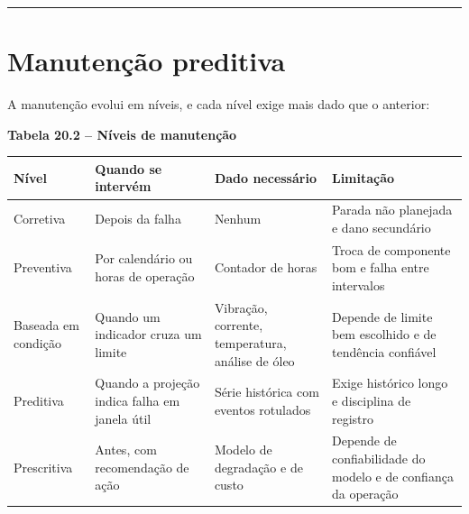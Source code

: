 \begin{center}\rule{0.5\linewidth}{0.5pt}\end{center}

\section{Manutenção preditiva}\label{manutenuxe7uxe3o-preditiva}

A manutenção evolui em níveis, e cada nível exige mais dado que o anterior:

\textbf{Tabela 20.2 -- Níveis de manutenção}

\begin{longtable}[]{@{}
  >{\raggedright\arraybackslash}p{}
  >{\raggedright\arraybackslash}p{}
  >{\raggedright\arraybackslash}p{}
  >{\raggedright\arraybackslash}p{}@{}}
\toprule\noalign{}
\begin{minipage}[b]{\linewidth}\raggedright
Nível
\end{minipage} & \begin{minipage}[b]{\linewidth}\raggedright
Quando se intervém
\end{minipage} & \begin{minipage}[b]{\linewidth}\raggedright
Dado necessário
\end{minipage} & \begin{minipage}[b]{\linewidth}\raggedright
Limitação
\end{minipage} \\
\midrule\noalign{}
\endhead
\bottomrule\noalign{}
\endlastfoot
Corretiva & Depois da falha & Nenhum & Parada não planejada e dano secundário \\
Preventiva & Por calendário ou horas de operação & Contador de horas & Troca de componente bom e falha entre intervalos \\
Baseada em condição & Quando um indicador cruza um limite & Vibração, corrente, temperatura, análise de óleo & Depende de limite bem escolhido e de tendência confiável \\
Preditiva & Quando a projeção indica falha em janela útil & Série histórica com eventos rotulados & Exige histórico longo e disciplina de registro \\
Prescritiva & Antes, com recomendação de ação & Modelo de degradação e de custo & Depende de confiabilidade do modelo e de confiança da operação \\
\end{longtable}

